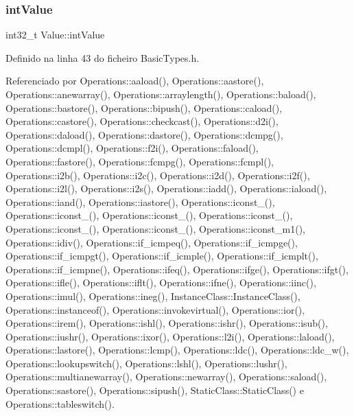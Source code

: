 \subsubsection{\texorpdfstring{int\+Value}{intValue}}
{\footnotesize\ttfamily int32\+\_\+t Value\+::int\+Value}



Definido na linha 43 do ficheiro Basic\+Types.\+h.



Referenciado por Operations\+::aaload(), Operations\+::aastore(), Operations\+::anewarray(), Operations\+::arraylength(), Operations\+::baload(), Operations\+::bastore(), Operations\+::bipush(), Operations\+::caload(), Operations\+::castore(), Operations\+::checkcast(), Operations\+::d2i(), Operations\+::daload(), Operations\+::dastore(), Operations\+::dcmpg(), Operations\+::dcmpl(), Operations\+::f2i(), Operations\+::faload(), Operations\+::fastore(), Operations\+::fcmpg(), Operations\+::fcmpl(), Operations\+::i2b(), Operations\+::i2c(), Operations\+::i2d(), Operations\+::i2f(), Operations\+::i2l(), Operations\+::i2s(), Operations\+::iadd(), Operations\+::iaload(), Operations\+::iand(), Operations\+::iastore(), Operations\+::iconst\+\_(), Operations\+::iconst\+\_(), Operations\+::iconst\+\_(), Operations\+::iconst\+\_(), Operations\+::iconst\+\_(), Operations\+::iconst\+\_(), Operations\+::iconst\+\_\+m1(), Operations\+::idiv(), Operations\+::if\+\_\+icmpeq(), Operations\+::if\+\_\+icmpge(), Operations\+::if\+\_\+icmpgt(), Operations\+::if\+\_\+icmple(), Operations\+::if\+\_\+icmplt(), Operations\+::if\+\_\+icmpne(), Operations\+::ifeq(), Operations\+::ifge(), Operations\+::ifgt(), Operations\+::ifle(), Operations\+::iflt(), Operations\+::ifne(), Operations\+::iinc(), Operations\+::imul(), Operations\+::ineg(), Instance\+Class\+::\+Instance\+Class(), Operations\+::instanceof(), Operations\+::invokevirtual(), Operations\+::ior(), Operations\+::irem(), Operations\+::ishl(), Operations\+::ishr(), Operations\+::isub(), Operations\+::iushr(), Operations\+::ixor(), Operations\+::l2i(), Operations\+::laload(), Operations\+::lastore(), Operations\+::lcmp(), Operations\+::ldc(), Operations\+::ldc\+\_\+w(), Operations\+::lookupswitch(), Operations\+::lshl(), Operations\+::lushr(), Operations\+::multianewarray(), Operations\+::newarray(), Operations\+::saload(), Operations\+::sastore(), Operations\+::sipush(), Static\+Class\+::\+Static\+Class() e Operations\+::tableswitch().

\mbox{\label{structValue_a91024026ad1f8f7221fa84f5a44a3d6c}} 
